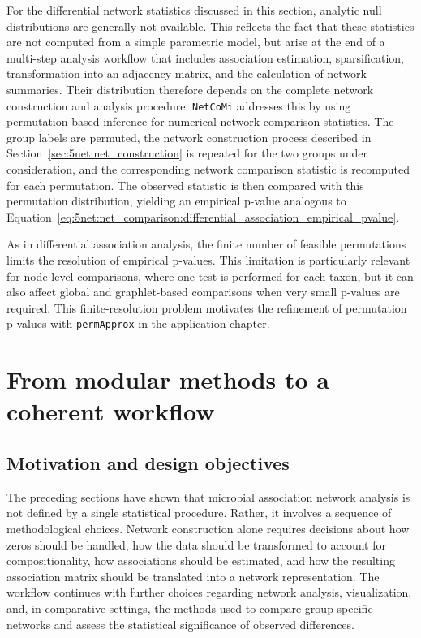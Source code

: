 For the differential network statistics discussed in this section, analytic null distributions are generally not available. This reflects the fact that these statistics are not computed from a simple parametric model, but arise at the end of a multi-step analysis workflow that includes association estimation, sparsification, transformation into an adjacency matrix, and the calculation of network summaries. Their distribution therefore depends on the complete network construction and analysis procedure. \texttt{NetCoMi} addresses this by using permutation-based inference for numerical network comparison statistics. The group labels are permuted, the network construction process described in Section~\ref{sec:5net:net_construction} is repeated for the two groups under consideration, and the corresponding network comparison statistic is recomputed for each permutation. The observed statistic is then compared with this permutation distribution, yielding an empirical p-value analogous to Equation~\ref{eq:5net:net_comparison:differential_association_empirical_pvalue}.

As in differential association analysis, the finite number of feasible permutations limits the resolution of empirical p-values. This limitation is particularly relevant for node-level comparisons, where one test is performed for each taxon, but it can also affect global and graphlet-based comparisons when very small p-values are required. This finite-resolution problem motivates the refinement of permutation p-values with \texttt{permApprox} in the application chapter.

\section{From modular methods to a coherent workflow}
\label{sec:5net:workflow_implementation}

\subsection{Motivation and design objectives}
\label{sec:5net:workflow_implementation:motivation}

The preceding sections have shown that microbial association network analysis is not defined by a single statistical procedure. Rather, it involves a sequence of methodological choices. Network construction alone requires decisions about how zeros should be handled, how the data should be transformed to account for compositionality, how associations should be estimated, and how the resulting association matrix should be translated into a network representation. The workflow continues with further choices regarding network analysis, visualization, and, in comparative settings, the methods used to compare group-specific networks and assess the statistical significance of observed differences.

